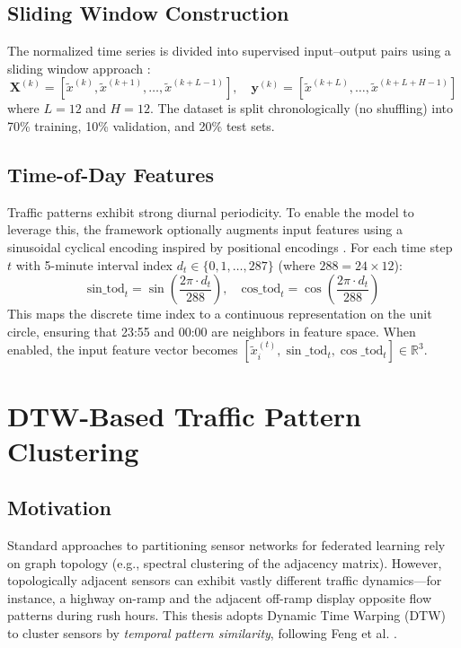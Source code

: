 \subsection{Sliding Window Construction}
The normalized time series is divided into supervised input--output pairs using a sliding window approach \cite{li2018}:
\begin{equation}
\mathbf{X}^{(k)} = [\tilde{x}^{(k)}, \tilde{x}^{(k+1)}, \dots, \tilde{x}^{(k+L-1)}], \quad
\mathbf{y}^{(k)} = [\tilde{x}^{(k+L)}, \dots, \tilde{x}^{(k+L+H-1)}]
\end{equation}
where $L = 12$ and $H = 12$. The dataset is split chronologically (no shuffling) into 70\% training, 10\% validation, and 20\% test sets.

\subsection{Time-of-Day Features}
\label{sec:tod_features}
Traffic patterns exhibit strong diurnal periodicity. To enable the model to leverage this, the framework optionally augments input features using a sinusoidal cyclical encoding inspired by positional encodings \cite{vaswani2017attention}. For each time step $t$ with 5-minute interval index $d_t \in \{0, 1, \dots, 287\}$ (where $288 = 24 \times 12$):
\begin{equation}
\text{sin\_tod}_t = \sin\left(\frac{2\pi \cdot d_t}{288}\right), \quad
\text{cos\_tod}_t = \cos\left(\frac{2\pi \cdot d_t}{288}\right)
\end{equation}
This maps the discrete time index to a continuous representation on the unit circle, ensuring that 23:55 and 00:00 are neighbors in feature space. When enabled, the input feature vector becomes $[\tilde{x}_i^{(t)}, \sin\_\text{tod}_t, \cos\_\text{tod}_t] \in \mathbb{R}^3$.

\section{DTW-Based Traffic Pattern Clustering}
\label{sec:dtw_clustering}

\subsection{Motivation}
Standard approaches to partitioning sensor networks for federated learning rely on graph topology (e.g., spectral clustering of the adjacency matrix). However, topologically adjacent sensors can exhibit vastly different traffic dynamics---for instance, a highway on-ramp and the adjacent off-ramp display opposite flow patterns during rush hours. This thesis adopts Dynamic Time Warping (DTW) to cluster sensors by \textit{temporal pattern similarity}, following Feng et al. \cite{feng2024}.

